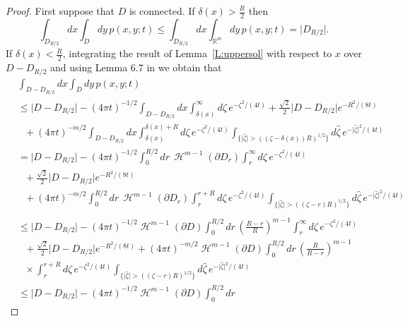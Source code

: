 \documentclass[a4paper,9pt]{amsart}
\begin{document}
\begin{proof} First suppose that $D$ is connected.
If $\delta(x) > \frac{R}{2}$ then
\[\int_{D_{R/2}} dx \int_{D} dy \, p(x,y;t) \leq \int_{D_{R/2}} dx \int_{\mathbb{R}^{m}} dy \, p(x,y;t)
= \big\vert D_{R/2} \big\vert.\] If $\delta(x)<\frac{R}{2}$,
integrating the result of Lemma~\ref{L:uppersol} with respect to
$x$ over $D-D_{R/2}$ and using Lemma 6.7 in \cite{vdBD89} we
obtain that
\begin{align*}
&\int_{D-D_{R/2}} dx \int_{D} dy \, p(x,y;t)\\
&\leq \big\vert D-D_{R/2}\big\vert - (4\pi
t)^{-1/2}\int_{D-D_{R/2}} dx \int_{\delta(x)}^{\infty} d\zeta
\,e^{-\zeta^{2}/(4t)} + \frac{\sqrt{2}}{2}\big\vert
D-D_{R/2}\big\vert
e^{-R^{2}/(8t)}\\
&\ \ \  + (4\pi t)^{-m/2}\int_{D-D_{R/2}} dx
\int_{\delta(x)}^{\delta(x)+R} d\zeta \, e^{-\zeta^{2}/(4t)}
\int_{\{\vert \hat{\zeta} \vert > ((\zeta-\delta(x))R)^{1/2}\}} d\hat{\zeta} \, e^{-\vert \hat{\zeta} \vert^{2}/(4t)}\\
&= \big\vert D-D_{R/2}\big\vert - (4\pi t)^{-1/2}\int_{0}^{R/2} dr
\, \operatorname{\mathcal{H}}^{m-1}(\partial D_{r}) \int_{r}^{\infty} d\zeta
\,e^{-\zeta^{2}/(4t)}\nonumber \\ &\ \ \  +
\frac{\sqrt{2}}{2}\big\vert D-D_{R/2}\big\vert
e^{-R^{2}/(8t)}\\
&\ \ \  + (4\pi t)^{-m/2}\int_{0}^{R/2} dr \, \operatorname{\mathcal{H}}^{m-1}(\partial
D_{r}) \int_{r}^{r+R} d\zeta \, e^{-\zeta^{2}/(4t)} \int_{\{\vert
\hat{\zeta} \vert > ((\zeta-r)R)^{1/2}\}} d\hat{\zeta} \,
e^{-\vert \hat{\zeta} \vert^{2}/(4t)}\\
\end{align*}
\begin{align*}
&\leq \big\vert D-D_{R/2}\big\vert - (4\pi
t)^{-1/2}\operatorname{\mathcal{H}}^{m-1}(\partial D)\int_{0}^{R/2} dr \,
\left(\frac{R-r}{R}\right)^{m-1} \int_{r}^{\infty} d\zeta
\,e^{-\zeta^{2}/(4t)}\nonumber \\ &\ \ \ +
\frac{\sqrt{2}}{2}\big\vert D-D_{R/2}\big\vert e^{-R^{2}/(8t)}+
(4\pi t)^{-m/2}\operatorname{\mathcal{H}}^{m-1}(\partial D)\int_{0}^{R/2} dr \,
\left(\frac{R}{R-r}\right)^{m-1}\nonumber \\ &\ \ \
\times\int_{r}^{r+R} d\zeta \,e^{-\zeta^{2}/(4t)} \int_{\{\vert
\hat{\zeta} \vert > ((\zeta-r)R)^{1/2}\}} d\hat{\zeta} \,
e^{-\vert \hat{\zeta} \vert^{2}/(4t)}\\
&\leq \big\vert D-D_{R/2}\big\vert - (4\pi
t)^{-1/2}\operatorname{\mathcal{H}}^{m-1}(\partial D)\int_{0}^{R/2} dr \,

\end{align*}
\end{proof}
\end{document}
